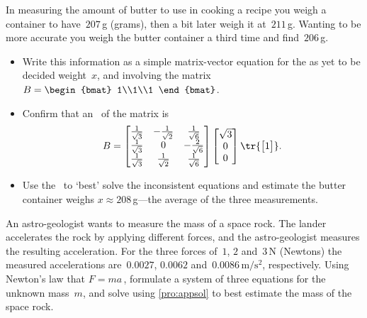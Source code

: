 \begin{exercise}  
In measuring the amount of butter to use in cooking a recipe you weigh a container to have~\(207\)\,g (grams), then a bit later weigh it at~\(211\)\,g.  
Wanting to be more accurate you weigh the butter container a third time and find~\(206\)\,g.
\begin{itemize}
\item Write this information as a simple matrix-vector equation for the as yet to be decided weight~\(x\), and involving the matrix \(B=\begin{bmat} 1\\1\\1 \end{bmat}\).
\item Confirm that an \svd\ of the matrix is
\begin{equation*}
B=\begin{bmatrix} \frac1{\sqrt3}&-\frac1{\sqrt2}&\frac1{\sqrt6}
\\\frac1{\sqrt3}&0&-\frac2{\sqrt6}
\\\frac1{\sqrt3}&\frac1{\sqrt2}&\frac1{\sqrt6}\end{bmatrix}
\begin{bmatrix} \sqrt3\\0\\0 \end{bmatrix}
\tr{\begin{bmatrix} 1 \end{bmatrix}}.
\end{equation*}
\item Use the \svd\ to `best' solve the inconsistent equations and estimate the butter container weighs \(x\approx 208\)\,g---the average of the three measurements.
\end{itemize}
\end{exercise}


\begin{comment}
Some of the following adapted from Chong, Ch.~12.
\end{comment}


\begin{exercise}  
An astro-geologist wants to measure the mass of a space rock.
The lander accelerates the rock by applying different forces, and the astro-geologist measures the resulting acceleration.
For the three forces of~\(1\), \(2\) and~\(3\)\,N (Newtons) the measured accelerations are~\(0.0027\), \(0.0062\) and~\(0.0086\,\text{m}/\text{s}^2\), respectively. 
Using Newton's law that \(F=ma\)\,, formulate a system of three equations for the unknown mass~\(m\), and solve using \cref{pro:appsol} to best estimate the mass of the space rock.
\end{exercise}


